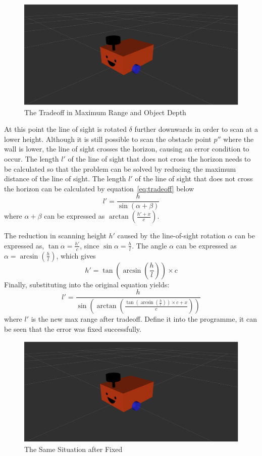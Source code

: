\begin{figure}[H]
    \centering
    \includegraphics[width=0.8\linewidth]{figs/robot.png}
    \caption{The Tradeoff in Maximum Range and Object Depth}
    \label{fig:tradeoff2}
\end{figure}

At this point the line of sight is rotated $\delta$ further downwards in order to scan at a lower height. Although it is still possible to scan the obstacle point $p''$ where the wall is lower, the line of sight crosses the horizon, causing an error condition to occur. The length $l'$ of the line of sight that does not cross the horizon needs to be calculated so that the problem can be solved by reducing the maximum distance of the line of sight. 
The length $l'$ of the line of sight that does not cross the horizon can be calculated by equation~\ref{eq:tradeoff} below 
\begin{equation}
    l'=\frac{h}{\sin{(\alpha+\beta)}}
    \label{eq:tradeoff}
\end{equation}
where $\alpha+\beta$ can be expressed as $\arctan(\frac{h'+x}{c})$. 

The reduction in scanning height $h'$ caused by the line-of-sight rotation $\alpha$ can be expressed as, $\tan\alpha=\frac{h'}{c}
$, since $\sin\alpha=\frac{h}{l}$. The angle $\alpha$ can be expressed as $\alpha=\arcsin(\frac{h}{l})$, which gives
\begin{equation}
    h'=\tan(\arcsin(\frac{h}{l}))\times c
\end{equation}
Finally, substituting into the original equation yields: 
\begin{equation}
    l'=\frac{h}{\sin{(\arctan(\frac{\tan(\arcsin(\frac{h}{l}))\times c+x}{c}))}}
\end{equation}
where $l'$ is the new max range after tradeoff. Define it into the programme, it can be seen that the error was fixed successfully.

\begin{figure}[H]
    \centering
    \includegraphics[width=0.8\linewidth]{figs/robot.png}
    \caption{The Same Situation after Fixed}
\end{figure}

